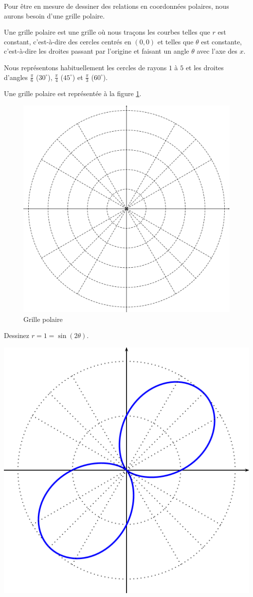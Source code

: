 \documentclass[]{book}
\theoremstyle{definition}
\theoremstyle{definition}
\theoremstyle{definition}
\theoremstyle{remark}
\let\BeginKnitrBlock\begin \let\EndKnitrBlock\end
\begin{document}
Pour être en mesure de dessiner des relations en coordonnées polaires,
nous aurons besoin d'une grille polaire.

\BeginKnitrBlock{definition}[Grille polaire]
\protect\hypertarget{def:unnamed-chunk-101}{}{\label{def:unnamed-chunk-101}
{} }Une grille polaire est une grille où
nous traçons les courbes telles que \(r\) est constant, c'est-à-dire des
cercles centrés en \((0,0)\) et telles que \(\theta\) est constante,
c'est-à-dire les droites passant par l'origine et faisant un angle
\(\theta\) avec l'axe des \(x\).

Nous représentons habituellement les cercles de rayons \(1\) à \(5\) et
les droites d'angles \(\frac{\pi}{6}\) (\(30^{\circ}\)),
\(\frac{\pi}{4}\) (\(45^{\circ}\)) et \(\frac{\pi}{3}\)
(\(60^{\circ}\)).

Une grille polaire est représentée à la figure \ref{fig:grillepolaire}.
\EndKnitrBlock{definition}

\begin{figure}

{\centering \includegraphics[width=0.5\linewidth]{resources/images/latex/grillepolaire} 

}

\caption{Grille polaire}\label{fig:grillepolaire}
\end{figure}

\BeginKnitrBlock{example}
\protect\hypertarget{exm:unnamed-chunk-102}{}{\label{exm:unnamed-chunk-102}
}Dessinez \(r=1=\sin(2\theta)\).
\EndKnitrBlock{example}

\begin{center}\includegraphics[width=0.5\linewidth]{resources/images/latex/ex1courbepolaire} \end{center}
\end{document}
